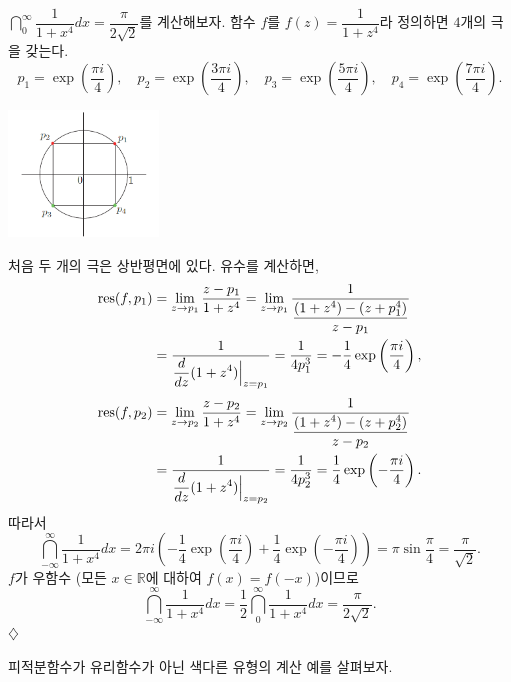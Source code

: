\begin{saltexample}{}{}\label{example-4-19}
$\dint_0^ \infty \dfrac1{1+x^4}dx = \dfrac{\pi}{2\sqrt{2}}$를 계산해보자.
함수 $f$를  $f(z) = \dfrac1{1+z^4}$라 정의하면 $4$개의 극을 갖는다.
\[
p_1 = \exp\left(\dfrac{\pi i}4\right), \quad
p_2 = \exp\left(\dfrac{3\pi i}4\right), \quad
p_3 = \exp\left(\dfrac{5\pi i}4\right), \quad
p_4 = \exp\left(\dfrac{7\pi i}4\right).
\]
\begin{center}
\includegraphics[width=0.3\textwidth]{./SaltChapter/fig-4-0-12}
\end{center}
\end{saltexample}
처음 두 개의 극은 상반평면에 있다. 유수를 계산하면,
\begin{align*}
\mathop{\mathrm{res}}(f,p_1) &= \lim_{z\to p_1} \displaystyle\frac{z-p_1}{1+z^4} 
= \lim_{z\to p_1} \displaystyle\frac1{\displaystyle\frac{(1+z^4) - (z+p_1^4)}{z-p_1}} \\
&= \displaystyle\frac1{\displaystyle\frac{d}{dz}(1+z^4)\Big|_{z=p_1}} = \displaystyle\frac1{4p_1^3}
= - \displaystyle\frac14 \exp\left(\displaystyle\frac{\pi i}4\right),
\end{align*}
\begin{align*}
\mathop{\mathrm{res}}(f,p_2) &= \lim_{z\to p_2} \displaystyle\frac{z-p_2}{1+z^4} 
= \lim_{z\to p_2} \displaystyle\frac1{\displaystyle\frac{(1+z^4) - (z+p_2^4)}{z-p_2}} \\
&= \displaystyle\frac1{\displaystyle\frac{d}{dz}(1+z^4)\Big|_{z=p_2}} = \displaystyle\frac1{4p_2^3}
= \displaystyle\frac14 \exp\left(-\displaystyle\frac{\pi i}4\right).
\end{align*}
따라서
\[
\dint_{-\infty}^ \infty \dfrac1{1+x^4}dx
= 2\pi i \left( - \dfrac14 \exp\left(\dfrac{\pi i}4\right)
+ \dfrac14 \exp\left(-\dfrac{\pi i}4\right) \right)
= \pi \sin \dfrac\pi 4 = \dfrac\pi{\sqrt{2}}.
\]
$f$가 우함수 (모든 $x\in\mathbb R$에 대하여 $f(x)=f(-x)$)이므로
\[
\dint_{-\infty}^ \infty \dfrac1{1+x^4}dx = \dfrac12 
\dint_0^ \infty \dfrac1{1+x^4}dx = \dfrac{\pi}{2\sqrt{2}}.
\]
\hfill $\diamondsuit$

피적분함수가 유리함수가 아닌 색다른  유형의 계산 예를 살펴보자.

